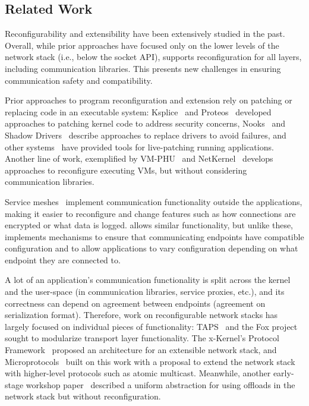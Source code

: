 \subsection{Related Work}\label{s:relwork}
Reconfigurability and extensibility have been extensively studied in the past. 
Overall, while prior approaches have focused only on the lower levels of the network stack (i.e., below the socket API), \name supports reconfiguration for all layers, including communication libraries. This presents new challenges in ensuring communication safety and compatibility.

 Prior approaches to program reconfiguration and extension rely on patching or replacing code in an executable system:  Ksplice~\cite{ksplice} and Proteos~\cite{proteos} developed approaches to patching kernel code to address security concerns, Nooks~\cite{nooks} and Shadow Drivers~\cite{shadow-drivers} describe approaches to replace drivers to avoid failures, and other systems~\cite{wfpatch, pylive} have provided tools for live-patching running applications. Another line of work, exemplified by VM-PHU~\cite{vm-phu} and NetKernel~\cite{netkernel} develops approaches to reconfigure executing VMs, but without considering communication libraries.

 Service meshes~\cite{service-router, envoy, istio} implement communication functionality outside the applications, making it easier to reconfigure and change features such as how connections are encrypted or what data is logged. \name allows similar functionality, but unlike these, implements mechanisms to ensure that communicating endpoints have compatible configuration and to allow applications to vary configuration depending on what endpoint they are connected to.

A lot of an application's communication functionality is split across the kernel and the user-space (\eg in communication libraries, service proxies, etc.), and its correctness can depend on agreement between endpoints (\eg agreement on serialization format). Therefore, work on reconfigurable network stacks has largely focused on individual pieces of functionality:
TAPS~\cite{taps} and the Fox project~\cite{biagioni} sought to modularize transport layer functionality.
The x-Kernel's Protocol Framework~\cite{xkernel} proposed an architecture for an extensible network stack, and Microprotocols~\cite{bhatti} built on this work with a proposal to extend the network stack with higher-level protocols such as atomic multicast.
Meanwhile, another early-stage workshop paper~\cite{bertha-hotnets} described a uniform abstraction for using offloads in the network stack but without reconfiguration.

